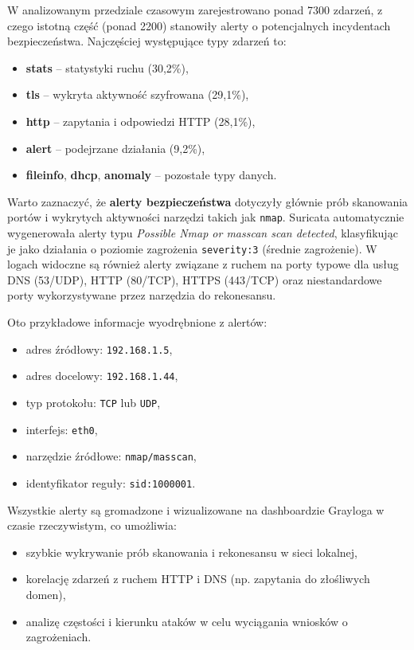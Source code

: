 \documentclass[
    left=2.5cm,         %
    right=2.5cm,        %
    top=2.5cm,          %
    bottom=3cm,         %
    bindingoffset=6mm,  %
    nohyphenation=true %
]{eiti/eiti-thesis} %
\begin{document}
W analizowanym przedziale czasowym zarejestrowano ponad 7300 zdarzeń, z czego istotną część (ponad 2200) stanowiły alerty o potencjalnych incydentach bezpieczeństwa. Najczęściej występujące typy zdarzeń to:
\begin{itemize}
    \item \textbf{stats} – statystyki ruchu (30,2\%),
    \item \textbf{tls} – wykryta aktywność szyfrowana (29,1\%),
    \item \textbf{http} – zapytania i odpowiedzi HTTP (28,1\%),
    \item \textbf{alert} – podejrzane działania (9,2\%),
    \item \textbf{fileinfo}, \textbf{dhcp}, \textbf{anomaly} – pozostałe typy danych.
\end{itemize}

Warto zaznaczyć, że \textbf{alerty bezpieczeństwa} dotyczyły głównie prób skanowania portów i wykrytych aktywności narzędzi takich jak \texttt{nmap}. Suricata automatycznie wygenerowała alerty typu \textit{Possible Nmap or masscan scan detected}, klasyfikując je jako działania o poziomie zagrożenia \texttt{severity:3} (średnie zagrożenie). W logach widoczne są również alerty związane z ruchem na porty typowe dla usług DNS (53/UDP), HTTP (80/TCP), HTTPS (443/TCP) oraz niestandardowe porty wykorzystywane przez narzędzia do rekonesansu.

Oto przykładowe informacje wyodrębnione z alertów:
\begin{itemize}
    \item adres źródłowy: \texttt{192.168.1.5},
    \item adres docelowy: \texttt{192.168.1.44},
    \item typ protokołu: \texttt{TCP} lub \texttt{UDP},
    \item interfejs: \texttt{eth0},
    \item narzędzie źródłowe: \texttt{nmap/masscan},
    \item identyfikator reguły: \texttt{sid:1000001}.
\end{itemize}

Wszystkie alerty są gromadzone i wizualizowane na dashboardzie Grayloga w czasie rzeczywistym, co umożliwia:
\begin{itemize}
    \item szybkie wykrywanie prób skanowania i rekonesansu w sieci lokalnej,
    \item korelację zdarzeń z ruchem HTTP i DNS (np. zapytania do złośliwych domen),
    \item analizę częstości i kierunku ataków w celu wyciągania wniosków o zagrożeniach.
\end{itemize}
\end{document}
